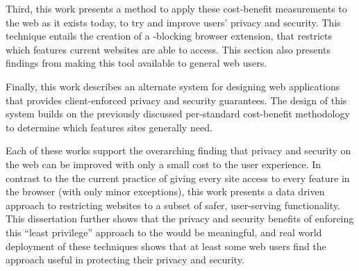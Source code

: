 Third, this work presents a method to apply these cost-benefit measurements
to the web as it exists today, to try and improve users' privacy and security.
This technique entails the creation of a \WAPI-blocking browser extension,
that restricts which features current websites are able to access.  This section
also presents findings from making this tool available to general web users.

Finally, this work describes an alternate system for designing
web applications that provides client-enforced privacy and security guarantees.
The design of this system builds on the previously discussed per-standard
cost-benefit methodology to determine which \WAPI features sites generally need.

Each of these works support the overarching finding that privacy
and security on the web can be improved with only a small cost to the user
experience. In contrast to the the current practice of giving every site access
to every feature in the browser (with only minor exceptions), this work presents
a data driven approach to restricting websites to a subset of safer, user-serving
functionality.  This dissertation further shows that the privacy and security
benefits of enforcing this ``least privilege'' approach to the \WAPI would
be meaningful, and real world deployment of these techniques shows that at
least some web users find the approach useful in protecting their privacy and
security.
